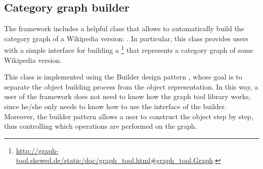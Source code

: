         \subsection{Category graph builder}\label{categorygraphbuilder}
            The framework includes a helpful class that allows to automatically build the category graph of a Wikipedia version: . In particular, this class provides users with a simple interface for building a  \footnote{\url{http://graph-tool.skewed.de/static/doc/graph_tool.html\#graph_tool.Graph}.} that represents a category graph of some Wikipedia version.
            
            This class is implemented using the Builder design pattern \cite{Gamma}, whose goal is to separate the object building process from the object representation. In this way, a user of the framework does not need to know how the graph tool library works, since he/she only needs to know how to use the interface of the builder. Moreover, the builder pattern allows a user to construct the object step by step, thus controlling which operations are performed on the graph.
            
